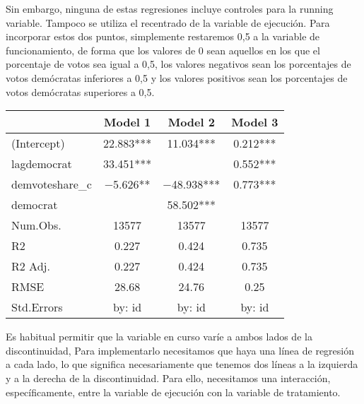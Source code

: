 \documentclass[
]{article}
\begin{document}
Sin embargo, ninguna de estas regresiones incluye controles para la
running variable. Tampoco se utiliza el recentrado de la variable de
ejecución. Para incorporar estos dos puntos, simplemente restaremos 0,5
a la variable de funcionamiento, de forma que los valores de 0 sean
aquellos en los que el porcentaje de votos sea igual a 0,5, los valores
negativos sean los porcentajes de votos demócratas inferiores a 0,5 y
los valores positivos sean los porcentajes de votos demócratas
superiores a 0,5.

\begin{table}
\centering
\begin{tabular}[t]{lccc}
\toprule
  & Model 1 & Model 2 & Model 3\\
\midrule
(Intercept) & \num{22.883}*** & \num{11.034}*** & \num{0.212}***\\
lagdemocrat & \num{33.451}*** &  & \num{0.552}***\\
demvoteshare\_c & \num{-5.626}** & \num{-48.938}*** & \num{0.773}***\\
democrat &  & \num{58.502}*** & \\
\midrule
Num.Obs. & \num{13577} & \num{13577} & \num{13577}\\
R2 & \num{0.227} & \num{0.424} & \num{0.735}\\
R2 Adj. & \num{0.227} & \num{0.424} & \num{0.735}\\
RMSE & \num{28.68} & \num{24.76} & \num{0.25}\\
Std.Errors & by: id & by: id & by: id\\
\bottomrule
\end{tabular}
\end{table}

Es habitual permitir que la variable en curso varíe a ambos lados de la
discontinuidad, Para implementarlo necesitamos que haya una línea de
regresión a cada lado, lo que significa necesariamente que tenemos dos
líneas a la izquierda y a la derecha de la discontinuidad. Para ello,
necesitamos una interacción, específicamente, entre la variable de
ejecución con la variable de tratamiento.
\end{document}
